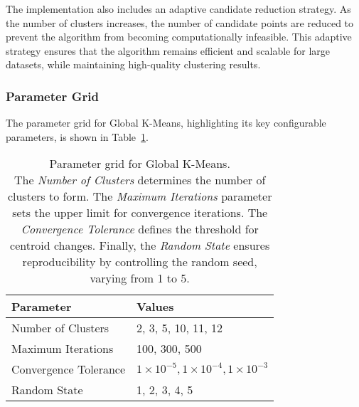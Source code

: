The implementation also includes an adaptive candidate reduction strategy. As the number of clusters increases, the number of candidate
points are reduced to prevent the algorithm from becoming computationally infeasible. This adaptive strategy ensures that the algorithm
remains efficient and scalable for large datasets, while maintaining high-quality clustering results.

\subsubsection*{Parameter Grid}

The parameter grid for Global K-Means, highlighting its key configurable parameters, is shown in Table~\ref{tab:globalkmeansparams}.

\begin{table}[h!]
\centering
\begin{tabularx}{\columnwidth}{|X|X|}
    \hline
    \textbf{Parameter} & \textbf{Values} \\ \hline
    Number of Clusters & 2, 3, 5, 10, 11, 12 \\ \hline
    Maximum Iterations & 100, 300, 500 \\ \hline
    Convergence Tolerance & \(1 \times 10^{-5}, 1 \times 10^{-4}, 1 \times 10^{-3}\) \\ \hline
    Random State & 1, 2, 3, 4, 5 \\ \hline
\end{tabularx}
\caption{
    Parameter grid for Global K-Means.\\ 
    The \textit{Number of Clusters} determines the number of clusters to form.
    The \textit{Maximum Iterations} parameter sets the upper limit for convergence iterations.
    The \textit{Convergence Tolerance} defines the threshold for centroid changes. 
    Finally, the \textit{Random State} ensures reproducibility by controlling the random seed, varying from 1 to 5.
}
\label{tab:globalkmeansparams}
\end{table}





